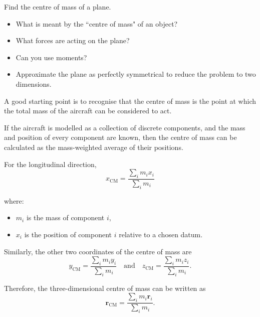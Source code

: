 \question

Find the centre of mass of a plane.

\begin{hints}
	\begin{itemize}
	    \item What is meant by the ``centre of mass" of an object?
	    \item What forces are acting on the plane?
	    \item Can you use moments?
	    \item Approximate the plane as perfectly symmetrical to reduce the problem to two dimensions.
	\end{itemize}
\end{hints}

\begin{solution}
	
	A good starting point is to recognise that the centre of mass is the point at which the total mass of the aircraft can be considered to act. 
	
	If the aircraft is modelled as a collection of discrete components, and the mass and position of every component are known, then the centre of mass can be calculated as the mass-weighted average of their positions. 
	
	For the longitudinal direction,
	\begin{equation}
	x_{\mathrm{CM}} = \frac{\sum_i m_i x_i}{\sum_i m_i}
	\end{equation}
	
	where:
	\begin{itemize} 
	    \item \(m_i\) is the mass of component \(i\), 
	    \item \(x_i\) is the position of component \(i\) relative to a chosen datum. 
	\end{itemize} 
	
	Similarly, the other two coordinates of the centre of mass are 
	\begin{equation}
		y_{\mathrm{CM}} = \frac{\sum_i m_i y_i}{\sum_i m_i} \quad \text{and} \quad z_{\mathrm{CM}} = \frac{\sum_i m_i z_i}{\sum_i m_i}.
	\end{equation}
	
	Therefore, the three-dimensional centre of mass can be written as 
	\begin{equation}
		\mathbf{r}_{\mathrm{CM}} = \frac{\sum_i m_i \mathbf{r}_i}{\sum_i m_i}.
	\end{equation}
	

\end{solution}
